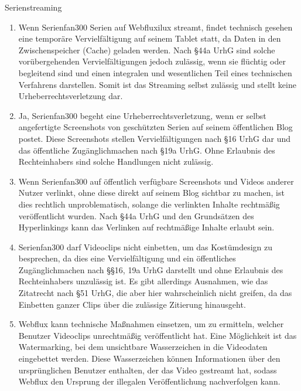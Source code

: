 \documentclass{article}
\begin{document}
\begin{exercise}{Serienstreaming}
  \begin{solution}
    \begin{enumerate}
      \item Wenn Serienfan300 Serien auf Webfluxilux streamt, findet technisch gesehen eine temporäre Vervielfältigung auf seinem Tablet statt, da Daten in den Zwischenspeicher (Cache) geladen werden. Nach §44a UrhG sind solche vorübergehenden Vervielfältigungen jedoch zulässig, wenn sie flüchtig oder begleitend sind und einen integralen und wesentlichen Teil eines technischen Verfahrens darstellen. Somit ist das Streaming selbst zulässig und stellt keine Urheberrechtsverletzung dar.
      \item Ja, Serienfan300 begeht eine Urheberrechtsverletzung, wenn er selbst angefertigte Screenshots von geschützten Serien auf seinem öffentlichen Blog postet. Diese Screenshots stellen Vervielfältigungen nach §16 UrhG dar und das öffentliche Zugänglichmachen nach §19a UrhG. Ohne Erlaubnis des Rechteinhabers sind solche Handlungen nicht zulässig.
      \item Wenn Serienfan300 auf öffentlich verfügbare Screenshots und Videos anderer Nutzer verlinkt, ohne diese direkt auf seinem Blog sichtbar zu machen, ist dies rechtlich unproblematisch, solange die verlinkten Inhalte rechtmäßig veröffentlicht wurden. Nach §44a UrhG und den Grundsätzen des Hyperlinkings kann das Verlinken auf rechtmäßige Inhalte erlaubt sein.
      \item Serienfan300 darf Videoclips nicht einbetten, um das Kostümdesign zu besprechen, da dies eine Vervielfältigung und ein öffentliches Zugänglichmachen nach §§16, 19a UrhG darstellt und ohne Erlaubnis des Rechteinhabers unzulässig ist. Es gibt allerdings Ausnahmen, wie das Zitatrecht nach §51 UrhG, die aber hier wahrscheinlich nicht greifen, da das Einbetten ganzer Clips über die zulässige Zitierung hinausgeht.
      \item Webflux kann technische Maßnahmen einsetzen, um zu ermitteln, welcher Benutzer Videoclips unrechtmäßig veröffentlicht hat. Eine Möglichkeit ist das Watermarking, bei dem unsichtbare Wasserzeichen in die Videodaten eingebettet werden. Diese Wasserzeichen können Informationen über den ursprünglichen Benutzer enthalten, der das Video gestreamt hat, sodass Webflux den Ursprung der illegalen Veröffentlichung nachverfolgen kann.
    \end{enumerate}
  \end{solution}
\end{exercise}
\end{document}
